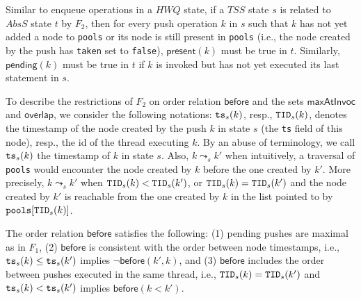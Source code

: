 Similar to enqueue operations in a $\mathit{HWQ}$ state, if a $\mathit{TSS}$ state $s$ is related to $AbsS$ state $t$ by $F_2$, then for every push operation $k$ in $s$ such that $k$ has not yet added a node to {\tt pools} or its node is still present in {\tt pools} (i.e., the node created by the push has {\tt taken} set to {\tt false}), $\mathsf{present}(k)$ must be true in $t$. Similarly, $\mathsf{pending}(k)$ must be true in $t$ if $k$ is invoked but has not yet executed its last statement in $s$. 

To describe the restrictions of $F_2$ on order relation $\mathsf{before}$ and the sets $\mathsf{maxAtInvoc}$ and $\mathsf{overlap}$, we consider the following notations: ${\tt ts}_s(k)$, resp., ${\tt TID}_s(k)$, denotes the timestamp of the node created by the push $k$ in state $s$ (the {\tt ts} field of this node), resp., the id of the thread executing $k$. By an abuse of terminology, we call ${\tt ts}_s(k)$ the timestamp of $k$ in state $s$.
Also, $k \leadsto_s k'$ when intuitively, a traversal of {\tt pools}  would encounter the node created by $k$ before the one created by $k'$. More precisely, $k \leadsto_s k'$ when ${\tt TID}_s(k) < {\tt TID}_s(k')$, or ${\tt TID}_s(k) = {\tt TID}_s(k')$ and the node created by $k'$ is reachable from the one created by $k$ in the list pointed to by ${\tt pools}[{\tt TID}_s(k)]$.

The order relation $\mathsf{before}$ satisfies the following: (1) pending pushes are maximal as in $F_1$, (2) $\mathsf{before}$ is consistent with the order between node timestamps, i.e., ${\tt ts}_s(k) \leq {\tt ts}_s(k')$ implies $\neg \mathsf{before}(k',k)$, and (3) $\mathsf{before}$ includes the order between pushes executed in the same thread, i.e., ${\tt TID}_s(k) = {\tt TID}_s(k')$ and ${\tt ts}_s(k) < {\tt ts}_s(k')$ implies $\mathsf{before}(k < k')$.

